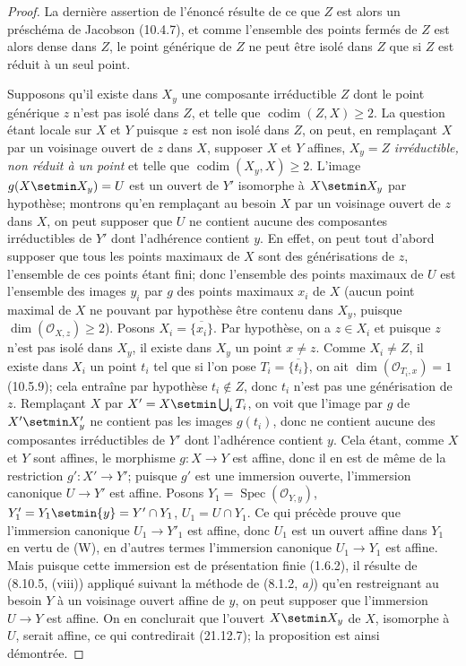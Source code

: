 \begin{proof}
La dernière assertion de l'énoncé résulte de ce que $Z$ est alors un préschéma de
Jacobson (10.4.7), et comme l'ensemble des points fermés de $Z$ est alors dense dans
$Z$, le point générique de $Z$ ne peut être isolé dans $Z$ que si $Z$ est réduit à un
seul point.

Supposons qu'il existe dans $X_y$ une composante irréductible $Z$ dont le point
générique $z$ n'est pas isolé dans $Z$, et telle que $\operatorname{codim}(Z,X)\geq2$.
La question étant locale
sur $X$ et $Y$ puisque $z$ est non isolé dans $Z$, on peut, en
remplaçant $X$ par un voisinage ouvert de $z$ dans $X$, supposer $X$ et $Y$ affines,
$X_y=Z$ \emph{irréductible, non réduit à un point} et telle que
$\operatorname{codim}(X_y,X)\geq2$. L'image $g(X\setmin X_y)=U$ est un ouvert de $Y'$
isomorphe à $X\setmin X_y$ par hypothèse; montrons qu'en remplaçant au besoin $X$ par un
voisinage ouvert de $z$ dans $X$, on peut supposer que $U$ ne contient aucune des
composantes irréductibles de $Y'$ dont l'adhérence contient $y$.
En effet, on peut tout d'abord supposer que tous les points maximaux de $X$ sont des
générisations de $z$, l'ensemble de ces points étant fini; donc l'ensemble des points
maximaux de $U$ est l'ensemble des images $y_i$ par $g$ des points maximaux $x_i$ de
$X$ (aucun point maximal de $X$ ne pouvant par hypothèse être contenu dans $X_y$,
puisque $\dim(\mathcal O_{X,z})\geq2$). Posons $X_i=\overline{\{x_i\}}$. Par
hypothèse, on a $z\in X_i$ et puisque $z$ n'est pas isolé dans $X_y$, il existe dans
$X_y$ un point $x\ne z$. Comme $X_i\ne Z$, il existe dans $X_i$ un point $t_i$ tel
que si l'on pose $T_i=\overline{\{t_i\}}$, on ait $\dim(\mathcal O_{T_i,x})=1$
(10.5.9); cela entraîne par hypothèse $t_i\notin Z$, donc $t_i$ n'est pas une
générisation de $z$. Remplaçant $X$ par $X'=X\setmin\bigcup_iT_i$, on voit que l'image par
$g$ de $X'\setmin X'_y$ ne contient pas les images $g(t_i)$, donc ne contient aucune des
composantes irréductibles de $Y'$ dont l'adhérence contient $y$.
Cela étant, comme $X$ et $Y$ sont affines, le morphisme $g:X\to Y$ est affine, donc il
en est de même de la restriction $g':X'\to Y'$; puisque $g'$ est une immersion ouverte,
l'immersion canonique $U\to Y'$ est affine. Posons
$Y_1=\operatorname{Spec}(\mathcal O_{Y,y})$, $Y'_1=Y_1\setmin\{y\}=Y'\cap Y_1$,
$U_1=U\cap Y_1$. Ce qui précède prouve que l'immersion canonique $U_1\to Y'_1$ est
affine, donc $U_1$ est un ouvert affine dans $Y_1$ en vertu de (W), en d'autres termes
l'immersion canonique $U_1\to Y_1$ est affine. Mais puisque cette immersion est de
présentation finie (1.6.2), il résulte de (8.10.5, (viii)) appliqué suivant la méthode de
(8.1.2, \emph{a)}) qu'en restreignant au besoin $Y$ à un voisinage ouvert affine de $y$, on peut
supposer que l'immersion $U\to Y$ est affine. On en conclurait que l'ouvert $X\setmin X_y$ de
$X$, isomorphe à $U$, serait affine, ce qui contredirait (21.12.7); la proposition est
ainsi démontrée.
\end{proof}

